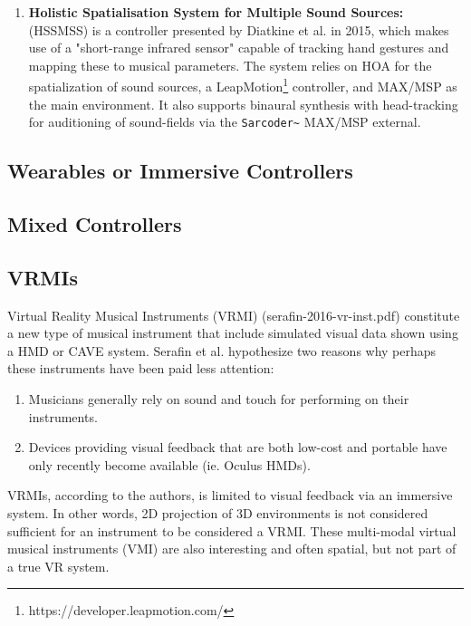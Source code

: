 \begin{enumerate}
    
    \item \textbf{Holistic Spatialisation System for Multiple Sound Sources:} (HSSMSS) is a controller presented by Diatkine et al. in 2015, which makes use of a "short-range infrared sensor" capable of tracking hand gestures and mapping these to musical parameters. The system relies on HOA for the spatialization of sound sources, a LeapMotion\footnote{https://developer.leapmotion.com/} controller, and MAX/MSP as the main environment. It also supports binaural synthesis with head-tracking for auditioning of sound-fields via the \texttt{Sarcoder\~} MAX/MSP external.
\end{enumerate}

\subsection{Wearables or Immersive Controllers} %


\subsection{Mixed Controllers} %


\subsection{VRMIs}

Virtual Reality Musical Instruments (VRMI) (serafin-2016-vr-inst.pdf) constitute a new type of musical instrument that include simulated visual data shown using a HMD or CAVE system. Serafin et al. hypothesize two reasons why perhaps these instruments have been paid less attention:

\begin{enumerate}
    \item Musicians generally rely on sound and touch for performing on their instruments.
    \item Devices providing visual feedback that are both low-cost and portable have only recently become available (ie. Oculus HMDs). 
\end{enumerate}

VRMIs, according to the authors, is limited to visual feedback via an immersive system. In other words, 2D projection of 3D environments is not considered sufficient for an instrument to be considered a VRMI. These multi-modal virtual musical instruments (VMI) are also interesting and often spatial, but not part of a true VR system.

